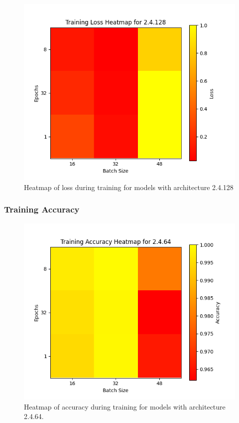 \documentclass[12pt]{article}
\begin{document}
\begin{figure}[H]
\includegraphics[width=\textwidth]{heatmap_training_loss_2.4.128}
\centering
\caption{Heatmap of loss during training for models with architecture 2.4.128}
\label{fig:time-metrics}
\end{figure}


\subsubsection{Training Accuracy}

\begin{figure}[H]
\includegraphics[width=\textwidth]{heatmap_training_accuracy_2.4.64}
\centering
\caption{Heatmap of accuracy during training for models with architecture 2.4.64.}
\label{fig:time-metrics}
\end{figure}
\end{document}
